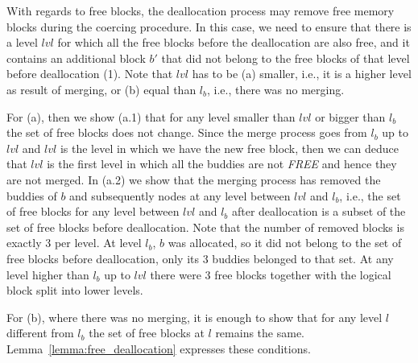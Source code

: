 With regards to free blocks, the deallocation process may remove free memory blocks during the coercing procedure. In this case, we need to ensure that there is a level $lvl$ for which all the free blocks before the deallocation are also free, and it contains an additional block $b'$ that did not belong to the free blocks of that level before deallocation (1). Note that $lvl$ has to be (a) smaller, i.e., it is a higher level as result of merging, or (b) equal than $l_b$, i.e., there was no merging.

For (a), then we show (a.1) that for any level smaller than $lvl$ or bigger than $l_b$ the set of free blocks does not change. Since the merge process goes from $l_b$ up to $lvl$ and  $lvl$ is the level in which we have the new free block, then we can deduce that $lvl$ is the first level in which all the buddies are not \emph{FREE} and hence they are not merged. In (a.2) we show that the merging process has removed the buddies of $b$ and subsequently nodes at any level between $lvl$ and $l_b$, i.e., the set of free blocks for any level between $lvl$ and $l_b$ after deallocation is a subset of the set of free blocks before deallocation. Note that the number of removed blocks is exactly 3 per level. At level $l_b$, $b$ was allocated, so it did not belong to the set of free blocks before deallocation, only its 3 buddies belonged to that set. At any level higher than $l_b$ up to $lvl$ there were 3 free blocks together with the logical block split into lower levels.

For (b), where there was no merging, it is enough to show that for any level $l$ different from $l_b$ the set of free blocks at $l$ remains the same. Lemma~\ref{lemma:free_deallocation} expresses these conditions.

